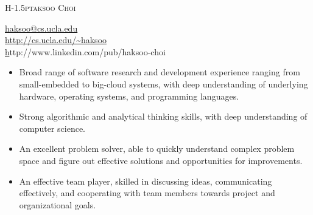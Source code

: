 \documentclass[12pt,letterpaper]{article}
\makeatletter
\def\myemail{haksoo@cs.ucla.edu}
\def\myweb{http://cs.ucla.edu/~haksoo}
\def\mylinkedin{http://www.linkedin.com/pub/haksoo-choi}
\def\mylinkedinpub{https://www.linkedin.com/pub/haksoo-choi/24/590/48}
\def\myvspace{\vspace{-0.22in}}
\newcommand{\mhead}[1]{\leavevmode\marginpar{\sffamily\footnotesize #1}}
\makeatother
\begin{document}
\flushbottom
\pagestyle{fancy} \setlength\headwidth{6.5in}
 \cfoot{}
\thispagestyle{empty}
\begin{adjustwidth}{-1in}{}
{\Huge
  {\textsc{%
    {H}\kern-1.5ptaksoo 
    {C}hoi}
  }
}
\hfill\hfill\hfill
{
  \begin{minipage}[b]{1.6in}
  \end{minipage}
  \hfill
  \begin{minipage}[b]{2.5in}
    \flushright \footnotesize 
    \href{mailto:\myemail}{\myemail} \\
    \href{\myweb}{http://cs.ucla.edu/\textasciitilde haksoo} \\
    \href{\mylinkedinpub}\mylinkedin \\
  \end{minipage}
}\par
\hrulefill
\end{adjustwidth}  
\reversemarginpar 
\setlength\marginparwidth{0.85in}
\medskip
\mhead{Summary}%
\myvspace
\begin{itemize}
\item Broad range of software research and development experience ranging from small-embedded to big-cloud systems, with deep understanding of underlying hardware, operating systems, and programming
languages.
\item Strong algorithmic and analytical thinking skills, with deep understanding of computer science.
\item An excellent problem solver, able to quickly understand complex problem space and figure out effective solutions and opportunities for improvements.
\item An effective team player, skilled in discussing ideas, communicating effectively, and cooperating with team members towards project and organizational goals.
\end{itemize}
\end{document}
